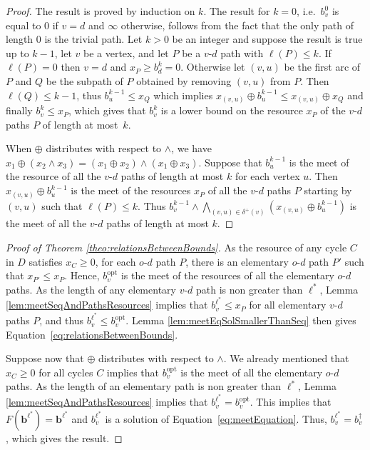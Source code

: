 \documentclass[11pt]{amsart}
\theoremstyle{plain}
\theoremstyle{remark}
\newcommand{\rplus}{\oplus}
\newcommand{\rleq}{\leqslant}
\newcommand{\rgeq}{\geqslant}
\newcommand{\re}{x}
\newcommand{\meet}{\wedge} \newcommand{\bigmeet}{\bigwedge}
\begin{document}
\begin{proof}
The result is proved by induction on $k$. The result for $k=0$, i.e.\ $b_{v}^{0}$ is equal to $0$ if $v=d$ and $\infty$ otherwise, follows from the fact that the only path of length $0$ is the trivial path. Let $k > 0$ be an integer and suppose the result is true up to $k-1$, let $v$ be a vertex, and let $P$ be a $v$-$d$ path with $\ell(P) \leq k$. If $\ell(P) = 0$ then $v = d$ and $\re_{P} \rgeq b_{d}^{k} = 0$. Otherwise let $(v,u)$ be the first arc of $P$ and $Q$ be the subpath of $P$ obtained by removing $(v,u)$ from $P$. Then $\ell(Q)\leq k-1$, thus $b_{u}^{k-1} \rleq \re_{Q}$ which implies $\re_{(v,u)} \rplus b_{u}^{k-1} \rleq \re_{(v,u)} \rplus \re_{Q}$ and finally $b_{v}^{k} \rleq \re_{P}$, which gives that $b_{v}^{k}$ is a lower bound on the resource $\re_{P}$ of the $v$-$d$ paths $P$ of length at most~$k$.

When $\rplus$ distributes with respect to $\meet$, we have $\re_{1} \rplus (\re_{2} \meet \re_{3}) = (\re_{1} \rplus \re_{2}) \meet (\re_{1} \rplus \re_{3})$. Suppose that $b_{u}^{k-1}$ is the meet of the resource of all the $v$-$d$ paths of length at most $k$ for each vertex $u$. Then $\re_{(v,u)} \rplus b_{u}^{k-1}$ is the meet of the resources $\re_{P}$ of all the $v$-$d$ paths $P$ starting by $(v,u)$ such that $\ell(P)\leq k$. Thus $b_{v}^{k-1} \meet \displaystyle\bigmeet_{(v,u)\in \delta^{+}(v)}\left( \re_{(v,u)} \rplus b_{u}^{k-1} \right)$ is the meet of all the $v$-$d$ paths of length at most $k$.
\end{proof}
\begin{proof}[Proof of Theorem \ref{theo:relationsBetweenBounds}]
As the resource of any cycle $C$ in $D$ satisfies $\re_{C}\geq 0$, for each $o$-$d$ path $P$, there is an elementary $o$-$d$ path $P'$ such that $\re_{P'}\rleq \re_{P}$. Hence, $b_{v}^{\mathrm{opt}}$ is the meet of the resources of all the elementary $o$-$d$ paths. As the length of any elementary $v$-$d$ path is non greater than $\ell^{*}$, Lemma \ref{lem:meetSeqAndPathsResources} implies that $b_{v}^{\ell^{*}} \rleq \re_{P}$ for all elementary $v$-$d$ paths $P$, and thus $b_{v}^{\ell^{*}} \leq b_{v}^{\mathrm{opt}}$. Lemma \ref{lem:meetEqSolSmallerThanSeq} then gives Equation~\eqref{eq:relationsBetweenBounds}.

Suppose now that $\rplus$ distributes with respect to $\meet$. We already mentioned that $x_{C}\rgeq 0$ for all cycles $C$ implies that $b_{v}^{\mathrm{opt}}$ is the meet of all the elementary $o$-$d$ paths. 
As the length of an elementary path is non greater than $\ell^{*}$, Lemma \ref{lem:meetSeqAndPathsResources} implies that $b_{v}^{\ell^{*}}=b_{v}^{\mathrm{opt}}$. This implies that $F(\mathbf{b}^{\ell^{*}}) = \mathbf{b}^{\ell^{*}}$ and $b_{v}^{\ell^{*}}$ is a solution of Equation~\eqref{eq:meetEquation}. Thus, $b_{v}^{\ell^{*}} = b_{v}^{\dagger}$, which gives the result.
\end{proof}
\end{document}
